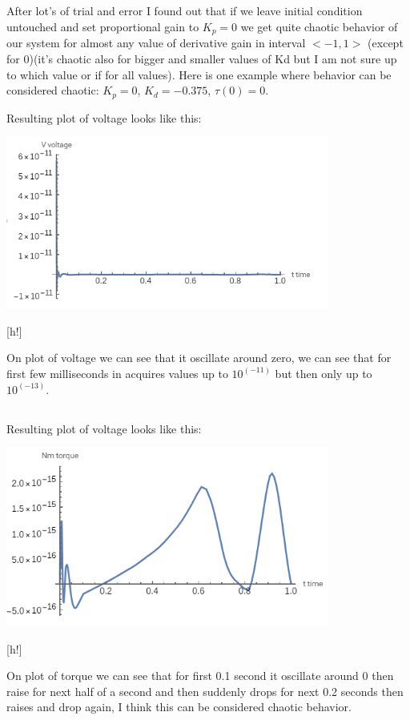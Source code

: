 \documentclass[a4paper]{article}
\begin{document}
	\subsection{}
	After lot's of trial and error I found out that if we leave initial condition untouched and set proportional gain to $K_p=0$ we get quite chaotic behavior of our system for almost any value of derivative gain in interval $<-1,1>$ (except for 0)(it's chaotic also for bigger and smaller values of Kd but I am not sure up to which value or if for all values).
	Here is one example where behavior can be considered chaotic: $K_p=0$, $K_d=-0.375$, $\tau(0)=0$. 
	
	Resulting plot of voltage looks like this:
	\\
	\centerline{\includegraphics[width=0.8\textwidth]{3_e_v}}[h!]
	
	On plot of voltage we can see that it oscillate around zero, we can see that for first few milliseconds in acquires values up to $10^(-11)$ but then only up to $10^(-13)$. 
	\subsection{}
	
	Resulting plot of voltage looks like this:
	\\
	\centerline{\includegraphics[width=0.8\textwidth]{3_f_t}}[h!]
	
	On plot of torque we can see that for first 0.1 second it oscillate around 0 then raise for next half of a second and then suddenly drops for next 0.2 seconds then raises and drop again, I think this can be considered chaotic behavior.
	
\end{document}
